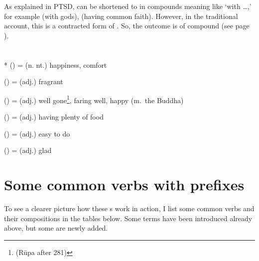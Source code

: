 As explained in PTSD,  can be shortened to  in compounds meaning like `with \ldots,' for example  (with gods),  (having common faith). However, in the traditional account, this  is a contracted form of . So, the outcome is of  compound (see page \pageref{par:sahapubba}).

\section*{}\label{upasagga:su}
\begin{compactitem}
\item {}* () = (n. nt.) happiness, comfort
\item {} () = (adj.) fragrant
\item {} () = (adj.) well gone\footnote{ (R\=upa after 281)}, faring well, happy (m.\ the Buddha)
\item {} () = (adj.) having plenty of food
\item {} () = (adj.) easy to do 
\item {} () = (adj.) glad
\end{compactitem}

\section*{Some common verbs with prefixes}

To see a clearer picture how these s work in action, I list some common verbs and their compositions in the tables below. Some terms have been introduced already above, but some are newly added.

